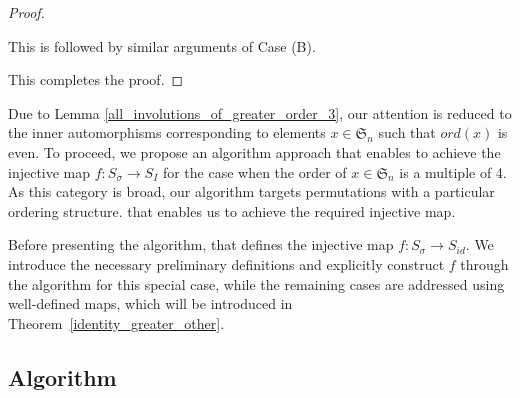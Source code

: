 \documentclass[oneside]{amsart}
\theoremstyle{plain}
\theoremstyle{definition}
\theoremstyle{remark}
\newcommand{\ord}{ord}
\begin{document}
\begin{proof}
\begin{itemize}
                This is followed by similar arguments of Case (B).
            \end{itemize}
            
            This completes the proof.
        \end{proof}
        Due to Lemma \ref{all_involutions_of_greater_order_3}, our attention is reduced to the inner automorphisms corresponding to elements $ x \in \mathfrak{S}_n$ such that $\ord(x)$ is even. To proceed, we propose an algorithm approach that enables to achieve the injective map $f: S_{\sigma} \to S_I$ for the case when the order of \( x \in \mathfrak{S}_n \) is a multiple of 4. As this category is broad, our algorithm targets permutations with a particular ordering structure. that enables us to achieve the required injective map.
        
        Before presenting the algorithm, that defines the injective map $f: S_{\sigma} \to S_{id}$. We introduce the necessary preliminary definitions and explicitly construct $f$ through the algorithm for this special case, while the remaining cases are addressed using well-defined maps, which will be introduced in Theorem~\ref{identity_greater_other}.
    \subsection{Algorithm}\label{algorithm}
    
\end{document}
